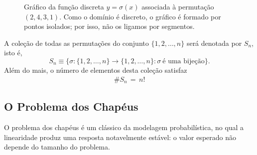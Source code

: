 \documentclass[12pt,portuguese]{article}
\theoremstyle{definition}
\begin{document}
\begin{figure}[H]
\centering
{}
\caption{Gráfico da função discreta $y=\sigma(x)$ associada à permutação
$(2,4,3,1)$. Como o domínio é discreto, o gráfico é formado por pontos isolados;
por isso, não os ligamos por segmentos.}
\label{fig:grafico-permutacao-2-4-3-1}
\end{figure}

A coleção de todas as
permutações do conjunto $\{1,2,\ldots,n\}$ será denotada por $S_n$, isto é,
\[
S_n\equiv \bigl\{\sigma:\{1,2,\ldots,n\}\to\{1,2,\ldots,n\}:
\sigma\ \text{é uma bijeção}\bigr\}.
\]
Além do mais, o número de elementos desta coleção satisfaz
\begin{align*}
\# S_n \, =\, n! 
\end{align*}

\subsection{O Problema dos Chapéus}\label{subsec:problema-chapeus}

O problema dos chapéus é um clássico da modelagem probabilística, no qual a
linearidade produz uma resposta notavelmente estável: o valor esperado não
depende do tamanho do problema.
\end{document}
